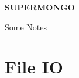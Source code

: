 \documentclass[11pt,a4paper,twoside,graphicx,color]{article}
\begin{document}
%
%
\begin{center}{\huge \bf
SUPERMONGO
}\end{center}
%

\centerline{Some Notes}






\section{File IO}
\end{document}
